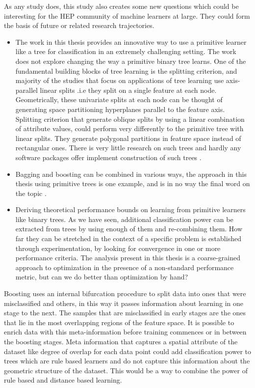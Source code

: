 As any study does, this study also creates some new questions which could be interesting for the HEP community of machine learners at large. They could form the basis of future or related research trajectories. 

\begin{itemize}
\item The work in this thesis provides an innovative way to use a primitive learner like a tree for classification in an extremely challenging setting. The work does not explore changing the way a primitive binary tree learns. One of the fundamental building blocks of tree learning is the splitting criterion, and majority of the studies that focus on applications of tree learning use axis-parallel linear splits .i.e they split on a single feature at each node. Geometrically, these univariate splits at each node can be thought of generating space partitioning hyperplanes parallel to the feature axis. Splitting criterion that generate oblique splits by using a linear combination of attribute values, could perform very differently to the primitive tree with linear splits. They generate polygonal partitions in feature space instead of rectangular ones.  There is very little research on such trees and hardly any software packages offer implement construction of such trees \cite{oblique}. 
\item Bagging and boosting can be combined in various ways, the approach in this thesis using primitive trees is one example, and is in no way the final word on the topic \cite{combining, combining2}. 
\item Deriving theoretical performance bounds on learning from primitive learners like binary trees. As we have seen, additional classification power can be extracted from trees by using enough of them and re-combining them. How far they can be stretched in the context of a specific problem is established through experimentation, by looking for convergence in one or more performance criteria. The analysis present in this thesis is a coarse-grained approach to optimization in the presence of a non-standard performance metric, but can we do better than optimization by hand? 
\end{itemize}

Boosting uses an internal bifurcation procedure to split data into ones that were misclassified and others, in this way it passes information about learning in one stage to the next. The samples that are misclassified in early stages are the ones that lie in the most overlapping regions of the feature space. It is possible to enrich data with this meta-information before training commences or in between the boosting stages. Meta information that captures a spatial attribute of the dataset like degree of overlap for each data point could add classification power to trees which are rule based learners and do not capture this information about the geometric structure of the dataset. This would be a way to combine the power of rule based and distance based learning.  

